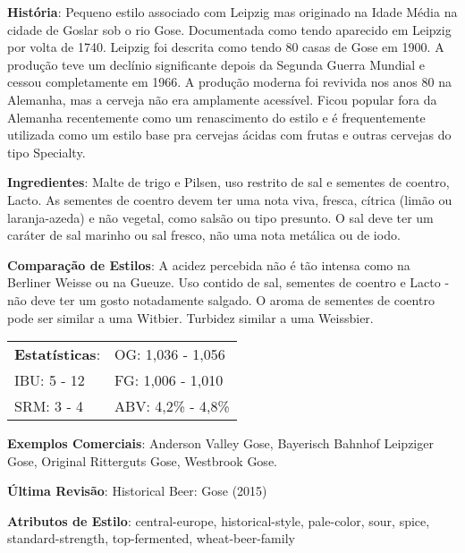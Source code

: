 \textbf{História}: Pequeno estilo associado com Leipzig mas originado na Idade Média na cidade de Goslar sob o rio Gose. Documentada como tendo aparecido em Leipzig por volta de 1740. Leipzig foi descrita como tendo 80 casas de Gose em 1900. A produção teve um declínio significante depois da Segunda Guerra Mundial e cessou completamente em 1966. A produção moderna foi revivida nos anos 80 na Alemanha, mas a cerveja não era amplamente acessível. Ficou popular fora da Alemanha recentemente como um renascimento do estilo e é frequentemente utilizada como um estilo base pra cervejas ácidas com frutas e outras cervejas do tipo Specialty.

\textbf{Ingredientes}: Malte de trigo e Pilsen, uso restrito de sal e sementes de coentro, Lacto. As sementes de coentro devem ter uma nota viva, fresca, cítrica (limão ou laranja-azeda) e não vegetal, como salsão ou tipo presunto. O sal deve ter um caráter de sal marinho ou sal fresco, não uma nota metálica ou de iodo.

\textbf{Comparação de Estilos}: A acidez percebida não é tão intensa como na Berliner Weisse ou na Gueuze. Uso contido de sal, sementes de coentro e Lacto - não deve ter um gosto notadamente salgado. O aroma de sementes de coentro pode ser similar a uma Witbier. Turbidez similar a uma Weissbier.

\begin{tabular}{@{}p{35mm}p{35mm}@{}}
  \textbf{Estatísticas}: & OG: 1,036 - 1,056 \\
  IBU: 5 - 12  & FG: 1,006 - 1,010  \\
  SRM: 3 - 4  & ABV: 4,2\% - 4,8\%
\end{tabular}

\textbf{Exemplos Comerciais}: Anderson Valley Gose, Bayerisch Bahnhof Leipziger Gose, Original Ritterguts Gose, Westbrook Gose.

\textbf{Última Revisão}: Historical Beer: Gose (2015)

\textbf{Atributos de Estilo}: central-europe, historical-style, pale-color, sour, spice, standard-strength, top-fermented, wheat-beer-family

